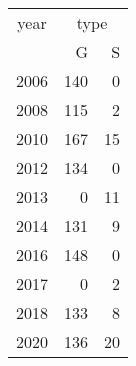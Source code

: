 \footnotesize\begin{tabular}[t]{lrr}
\toprule
\multicolumn{1}{c}{year} & \multicolumn{2}{c}{type} \\
\cmidrule(l{3pt}r{3pt}){1-1} \cmidrule(l{3pt}r{3pt}){2-3}
  & G & S\\
\midrule
2006 & 140 & 0\\
2008 & 115 & 2\\
2010 & 167 & 15\\
2012 & 134 & 0\\
2013 & 0 & 11\\
2014 & 131 & 9\\
2016 & 148 & 0\\
2017 & 0 & 2\\
2018 & 133 & 8\\
2020 & 136 & 20\\
\bottomrule
\end{tabular}
